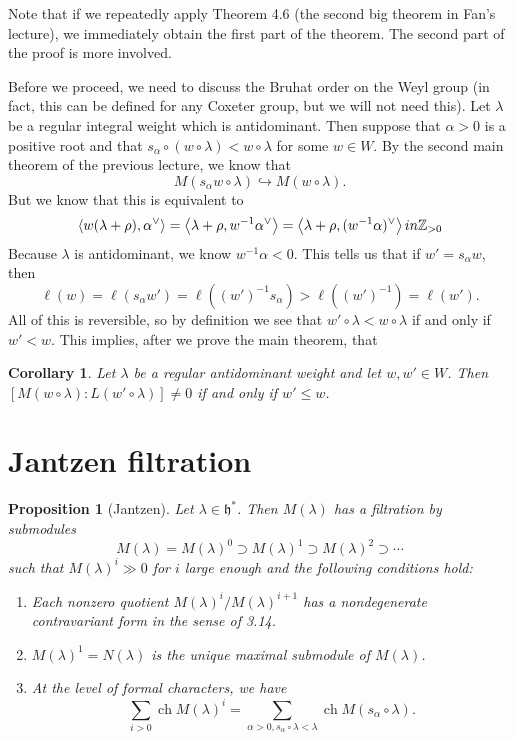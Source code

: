\documentclass[leqno, openany]{memoir}
\newtheorem{cor}[thm]{Corollary}
\newtheorem{prop}[thm]{Proposition}
\theoremstyle{definition}
\theoremstyle{remark}
\theoremstyle{plain}
\theoremstyle{definition}
\theoremstyle{remark}
\newcommand{\Z}{\mathbb{Z}}
\newcommand{\h}{\mathfrak{h}}
\begin{document}
Note that if we repeatedly apply Theorem 4.6 (the second big theorem in Fan's lecture), we immediately obtain the first part of the theorem. The second part of the proof is more involved.

Before we proceed, we need to discuss the Bruhat order on the Weyl group (in fact, this can be defined for any Coxeter group, but we will not need this). Let $\lambda$ be a regular integral weight which is antidominant. Then suppose that $\alpha > 0$ is a positive root and that $s_{\alpha} \circ (w \circ \lambda) < w \circ \lambda$ for some $w \in W$. By the second main theorem of the previous lecture, we know that
\[ M(s_{\alpha} w \circ \lambda) \hookrightarrow M(w \circ \lambda). \]
But we know that this is equivalent to
\[ \ev{w(\lambda + \rho), \alpha^{\vee}} = \ev{\lambda + \rho, w^{-1} \alpha^{\vee}} = \ev{\lambda + \rho, (w^{-1}\alpha)^{\vee}} in \Z_{>0} \]
Because $\lambda$ is antidominant, we know $w^{-1} \alpha < 0$. This tells us that if $w' = s_{\alpha} w$, then
\[ \ell(w) = \ell(s_{\alpha} w') = \ell((w')^{-1}s_{\alpha}) > \ell((w')^{-1}) = \ell(w'). \]
All of this is reversible, so by definition we see that $w' \circ \lambda < w \circ \lambda$ if and only if $w' < w$. This implies, after we prove the main theorem, that

\begin{cor}
  Let $\lambda$ be a regular antidominant weight and let $w, w' \in W$. Then $[M(w \circ \lambda) : L(w' \circ \lambda)] \neq 0$ if and only if $w' \leq w$.
\end{cor}

\section{Jantzen filtration}
\label{sec:jantzen_filtration}

\begin{prop}[Jantzen]
  Let $\lambda \in \h^{*}$. Then $M(\lambda)$ has a filtration by submodules
  \[ M(\lambda) = M(\lambda)^{0} \supset M(\lambda)^{1} \supset M(\lambda)^{2} \supset \cdots \]
  such that $M(\lambda)^{i} \gg 0$ for $i$ large enough and the following conditions hold:
  \begin{enumerate}
    \item Each nonzero quotient $M(\lambda)^{i} / M(\lambda)^{i+1}$ has a nondegenerate contravariant form in the sense of 3.14.
    \item $M(\lambda)^{1} = N(\lambda)$ is the unique maximal submodule of $M(\lambda)$.
    \item At the level of formal characters, we have
      \[ \sum_{i > 0} \operatorname{ch} M(\lambda)^{i} = \sum_{\alpha > 0, s_{\alpha} \circ \lambda < \lambda} \operatorname{ch} M(s_{\alpha} \circ \lambda). \]
  \end{enumerate}
\end{prop}
\end{document}
